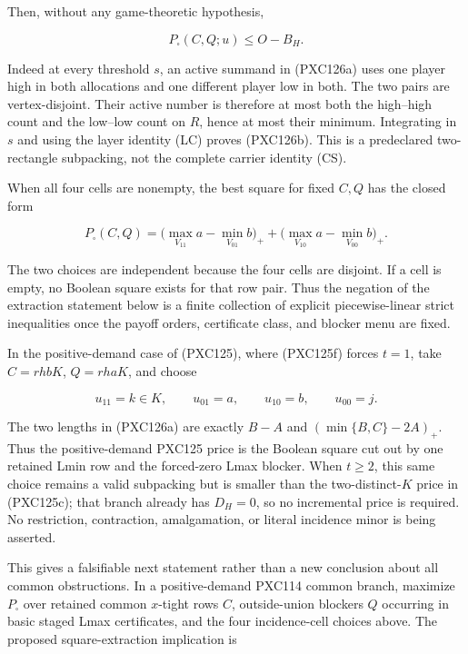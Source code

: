 \documentclass[11pt]{article}
\begin{document}
Then, without any game-theoretic hypothesis,

\begin{equation}
                  P_{\square}(C,Q;u)\le O-B_H.       \tag{PXC126b}
\end{equation}

Indeed at every threshold $s$, an active summand in (PXC126a) uses one
player high in both allocations and one different player low in both.
The two pairs are vertex-disjoint.  Their active number is therefore at
most both the high--high count and the low--low count on $R$, hence at
most their minimum.  Integrating in $s$ and using the layer identity (LC)
proves (PXC126b).  This is a predeclared two-rectangle subpacking, not the
complete carrier identity (CS).

When all four cells are nonempty, the best square for fixed $C,Q$ has the
closed form

\begin{equation}
 P_{\square}(C,Q)
 =\bigl(\max_{V_{11}}a-\min_{V_{01}}b\bigr)_+
  +\bigl(\max_{V_{10}}a-\min_{V_{00}}b\bigr)_+ .    \tag{PXC126c}
\end{equation}

The two choices are independent because the four cells are disjoint.  If a
cell is empty, no Boolean square exists for that row pair.  Thus the negation
of the extraction statement below is a finite collection of explicit
piecewise-linear strict inequalities once the payoff orders, certificate
class, and blocker menu are fixed.

In the positive-demand case of (PXC125), where (PXC125f) forces $t=1$,
take $C=rhbK$, $Q=rhaK$, and choose

\[
 u_{11}=k\in K,\qquad u_{01}=a,\qquad
 u_{10}=b,\qquad u_{00}=j.
\]

The two lengths in (PXC126a) are exactly
$B-A$ and $(\min\{B,C\}-2A)_+$.  Thus the positive-demand PXC125 price is
the Boolean square cut out by one retained Lmin row and the forced-zero Lmax
blocker.  When $t\ge2$, this same choice remains a valid subpacking but is
smaller than the two-distinct-$K$ price in (PXC125c); that branch already has
$D_H=0$, so no incremental price is required.
No restriction, contraction, amalgamation, or literal incidence minor is
being asserted.

This gives a falsifiable next statement rather than a new conclusion about
all common obstructions.  In a positive-demand PXC114 common branch, maximize
$P_{\square}$ over retained common $x$-tight rows $C$, outside-union
blockers $Q$ occurring in basic staged Lmax certificates, and the four
incidence-cell choices above.  The proposed square-extraction implication is
\end{document}
